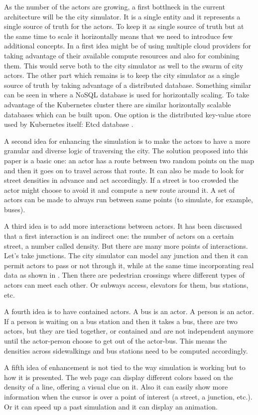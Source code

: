 \documentclass[conference]{IEEEtran}
\begin{document}
As the number of the actors are growing, a first bottlneck in the current architecture will be the city simulator. It is a single entity and it represents a single source of truth for the actors. To keep it as single source of truth but at the same time to scale it horizontally means that we need to introduce few additional concepts. In \cite{6847479} a first idea might be of using multiple cloud providers for taking advantage of their available compute resources and also for combining them. This would serve both to the city simulator as well to the swarm of city actors. The other part which remains is to keep the city simulator as a single source of truth by taking advantage of a distributed database. Something similar can be seen in \cite{8509417} where a NoSQL database is used for horizontally scaling. To take advantage of the Kubernetes cluster there are similar horizontally scalable databases which can be built upon. One option is the distributed key-value store used by Kubernetes itself: Etcd database \cite{etcd}.

A second idea for enhancing the simulation is to make the actors to have a more granular and diverse logic of traversing the city. The solution proposed into this paper is a basic one: an actor has a route between two random points on the map and then it goes on to travel across that route. It can also be made to look for street densities in advance and act accordingly. If a street is too crowded the actor might choose to avoid it and compute a new route around it. A set of actors can be made to always run between same points (to simulate, for example, buses).

A third idea is to add more interactions between actors. It has been discussed that a first interaction is an indirect one: the number of actors on a certain street, a number called density. But there are many more points of interactions. Let's take junctions. The city simulator can model any junction and then it can permit actors to pass or not through it, while at the same time incorporating real data as shown in \cite{urban-traffic-sim}. Then there are pedestrian crossings where different types of actors can meet each other. Or subways access, elevators for them, bus stations, etc.

A fourth idea is to have contained actors. A bus is an actor. A person is an actor. If a person is waiting on a bus station and then it takes a bus, there are two actors, but they are tied together, or contained and are not independent anymore until the actor-person choose to get out of the actor-bus. This means the densities across sidewalkings and bus stations need to be computed accordingly.

A fifth idea of enhancement is not tied to the way simulation is working but to how it is presented. The web page can display different colors based on the density of a line, offering a visual clue on it. Also it can easily show more information when the cursor is over a point of interest (a street, a junction, etc.). Or it can speed up a past simulation and it can display an animation.




\vspace{12pt}
\end{document}
